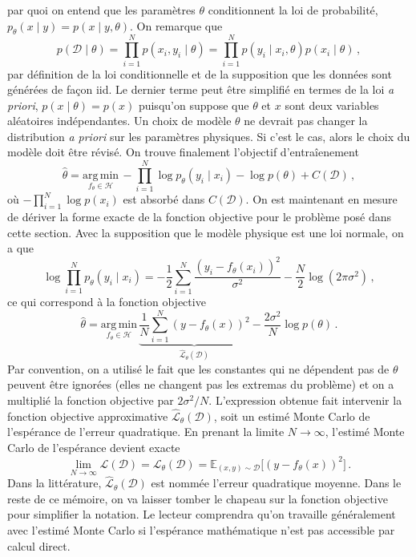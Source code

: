 par quoi on entend que les paramètres $\theta$ conditionnent la loi de probabilité, $p_\theta(x \mid y) = p(x \mid y, \theta)$. On remarque que
\begin{equation}
        p(\mathcal{D} \mid \theta) = \prod_{i=1}^{N}p(x_i, y_i \mid \theta) = \prod_{i=1}^{N}p(y_i \mid x_i, \theta) p(x_i \mid \theta)\, ,
\end{equation} 
par définition de la loi conditionnelle et de la supposition que les données sont générées de façon iid. 
Le dernier terme peut être simplifié en termes de la loi \textit{a priori}, $p(x \mid \theta) = p(x)$ 
puisqu'on suppose que $\theta$ et $x$ sont deux variables aléatoires indépendantes. Un choix de modèle $\theta$ ne devrait pas changer 
la distribution \textit{a priori} sur les paramètres physiques. Si c'est le cas, alors le choix du modèle doit être révisé.
On trouve finalement l'objectif d'entraîenement
\begin{equation}
        \hat{\theta} = \underset{f_\theta \in \mathcal{H}}{\mathrm{arg\, min}}\, -\prod_{i=1}^{N}\log p_\theta(y_i \mid x_i) - \log p(\theta) + C(\mathcal{D})\, ,
\end{equation} 
où $-\prod_{i=1}^N\log p(x_i)$ est absorbé dans $C(\mathcal{D})$. On est maintenant en mesure de dériver la forme exacte de la fonction objective pour le problème 
posé dans cette section. Avec la supposition que le modèle physique est une loi normale, on a que
\begin{equation}
       \log \prod_{i=1}^{N}p_\theta(y_i \mid x_i) = -\frac{1}{2}\sum_{i=1}^{N}\frac{(y_i - f_\theta(x_i))^2}{\sigma^2} - \frac{N}{2}\log(2\pi \sigma^2)\, ,
\end{equation} 
ce qui correspond à la fonction objective
\begin{equation}\label{eq:MSE intro}
        \hat{\theta} = \underset{f_\theta \in \mathcal{H}}{\mathrm{arg\, min}}\, \underbrace{ \frac{1}{N}\sum_{i=1}^{N}
        (y - f_\theta(x))^2 }_{\hat{\mathcal{L}}_\theta(\mathcal{D})}  - \frac{2\sigma^2}{N}\log p(\theta)\, .
\end{equation} 
Par convention, on a utilisé le fait que les constantes qui ne dépendent pas de $\theta$ peuvent être ignorées (elles ne changent pas les extremas du problème) 
et on a multiplié la fonction objective par $2\sigma^2 / N$. 
L'expression obtenue fait intervenir la fonction objective approximative $\hat{\mathcal{L}}_{\theta}(\mathcal{D})$, soit un estimé Monte Carlo de l'espérance de l'erreur 
quadratique. En prenant la limite $N \rightarrow \infty$, l'estimé Monte Carlo de l'espérance devient exacte
\begin{equation}
        \lim\limits_{N \rightarrow \infty}\hat{\mathcal{L}}(\mathcal{D}) = \mathcal{L}_{\theta}(\mathcal{D}) = \mathbb{E}_{(x, y) \sim \mathcal{D}} \big[(y - f_\theta(x))^2\big]\, .
\end{equation} 
Dans la littérature, $\hat{\mathcal{L}}_\theta(\mathcal{D})$ est nommée l'erreur quadratique moyenne. Dans le reste de ce mémoire, on va laisser 
tomber le chapeau sur la fonction objective pour simplifier la notation. Le lecteur comprendra qu'on travaille généralement avec l'estimé 
Monte Carlo si l'espérance mathématique n'est pas accessible par calcul direct.

